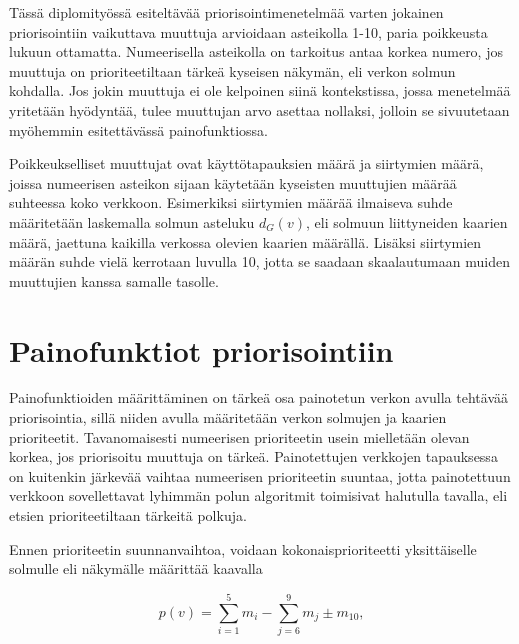   Tässä diplomityössä esiteltävää priorisointimenetelmää varten jokainen priorisointiin vaikuttava muuttuja arvioidaan asteikolla 1-10, paria poikkeusta lukuun ottamatta.
  Numeerisella asteikolla on tarkoitus antaa korkea numero, jos muuttuja on prioriteetiltaan tärkeä kyseisen näkymän, eli verkon solmun kohdalla.
  Jos jokin muuttuja ei ole kelpoinen siinä kontekstissa, jossa menetelmää yritetään hyödyntää, tulee muuttujan arvo asettaa nollaksi, jolloin se sivuutetaan myöhemmin esitettävässä painofunktiossa.

  Poikkeukselliset muuttujat ovat käyttötapauksien määrä ja siirtymien määrä, joissa numeerisen asteikon sijaan käytetään kyseisten muuttujien määrää suhteessa koko verkkoon.
  Esimerkiksi siirtymien määrää ilmaiseva suhde määritetään laskemalla solmun asteluku \(d_G(v)\), eli solmuun liittyneiden kaarien määrä, jaettuna kaikilla verkossa olevien kaarien määrällä.
  Lisäksi siirtymien määrän suhde vielä kerrotaan luvulla 10, jotta se saadaan skaalautumaan muiden muuttujien kanssa samalle tasolle.

\section{Painofunktiot priorisointiin} \label{ch:10_painofunktiot_priorisointiin}

  Painofunktioiden määrittäminen on tärkeä osa painotetun verkon avulla tehtävää priorisointia, sillä niiden avulla määritetään verkon solmujen ja kaarien prioriteetit.
  Tavanomaisesti numeerisen prioriteetin usein mielletään olevan korkea, jos priorisoitu muuttuja on tärkeä.
  Painotettujen verkkojen tapauksessa on kuitenkin järkevää vaihtaa numeerisen prioriteetin suuntaa, jotta painotettuun verkkoon sovellettavat lyhimmän polun algoritmit toimisivat halutulla tavalla, eli etsien prioriteetiltaan tärkeitä polkuja.

  Ennen prioriteetin suunnanvaihtoa, voidaan kokonaisprioriteetti yksittäiselle solmulle eli näkymälle määrittää kaavalla

  \begin{equation} \label{eq:5_4_1}
    p(v) = \sum\limits_{i=1}^{5} m_i - \sum\limits_{j=6}^{9} m_j \pm m_{10}\text{,}
  \end{equation}

